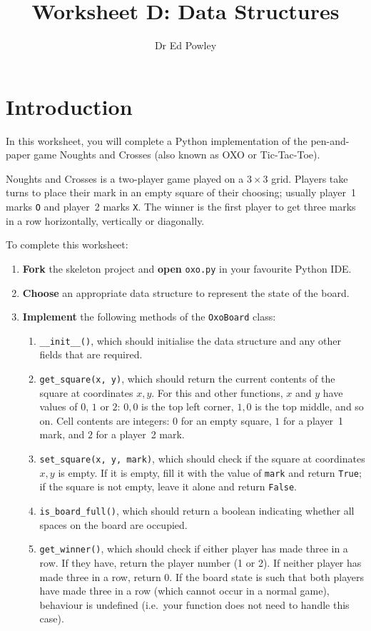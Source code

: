 \documentclass{../../../fal_assignment}
\title{Worksheet D: Data Structures}
\author{Dr Ed Powley}
\begin{document}
\maketitle
{}

\section*{Introduction}

In this worksheet, you will complete a Python implementation of the pen-and-paper game Noughts and Crosses
(also known as OXO or Tic-Tac-Toe).

Noughts and Crosses is a two-player game played on a $3 \times 3$ grid.
Players take turns to place their mark in an empty square of their choosing; usually
player~1 marks \texttt{O} and player~2 marks \texttt{X}.
The winner is the first player to get three marks in a row horizontally, vertically or diagonally.

To complete this worksheet:

\begin{enumerate}[label=(\alph*)]
	\item \textbf{Fork} the skeleton project and \textbf{open} \texttt{oxo.py} in your favourite Python IDE.
	\item \textbf{Choose} an appropriate data structure to represent the state of the board.
	\item \textbf{Implement} the following methods of the \lstinline{OxoBoard} class:
		\begin{enumerate}[label=(\roman*)]
			\item \lstinline{__init__()}, which should initialise the data structure and any other fields that are required.
			\item \lstinline{get_square(x, y)}, which should return the current contents of the square at coordinates $x,y$.
				For this and other functions, $x$ and $y$ have values of $0$, $1$ or $2$:
				$0,0$ is the top left corner, $1,0$ is the top middle, and so on.
				Cell contents are integers: $0$ for an empty square,
				$1$ for a player~1 mark, and $2$ for a player~2 mark.
			\item \lstinline{set_square(x, y, mark)}, which should check if the square at coordinates $x,y$ is empty.
				If it is empty, fill it with the value of \lstinline{mark} and return \lstinline{True};
				if the square is not empty, leave it alone and return \lstinline{False}.
			\item \lstinline{is_board_full()}, which should return a boolean indicating whether all spaces on the board are occupied.
			\item \lstinline{get_winner()}, which should check if either player has made three in a row.
				If they have, return the player number (1 or 2).
				If neither player has made three in a row, return 0.
				If the board state is such that both players have made three in a row (which cannot occur in a normal game),
				behaviour is undefined (i.e.\ your function does not need to handle this case).
		\end{enumerate}
\end{enumerate}
\end{document}
